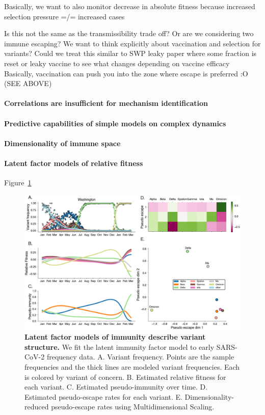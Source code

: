 \documentclass[12pt,oneside,letterpaper]{article}
\begin{document}
Basically, we want to also monitor decrease in absolute fitness because increased selection pressure =/= increased cases


Is this not the same as the transmissibility trade off? Or are we considering two immune escaping?
We want to think explicitly about vaccination and selection for variants?
Could we treat this similar to SWP leaky paper where some fraction is reset or leaky vaccine to see what changes depending on vaccine efficacy
Basically, vaccination can push you into the zone where escape is preferred :O (SEE ABOVE)

\paragraph{Correlations are insufficient for mechanism identification}%

\paragraph{Predictive capabilities of simple models on complex dynamics}%

\paragraph{Dimensionality of immune space}%

\paragraph{Latent factor models of relative fitness}

Figure~\ref{fig:latent_immune}

\begin{figure}[h]
    \centering
    \includegraphics[width=0.8\linewidth]{./figures/latent_immune.png}
    \caption{\textbf{Latent factor models of immunity describe variant structure.} 
        We fit the latent immunity factor model to early SARS-CoV-2 frequency data.
        A. Variant frequency. Points are the sample frequencies and the thick lines are modeled variant frequencies. Each is colored by variant of concern.
        B. Estimated relative fitness for each variant.
        C. Estimated pseudo-immunity over time.
        D. Estimated pseudo-escape rates for each variant.
        E. Dimensionality-reduced pseudo-escape rates using Multidimensional Scaling.
    }
\label{fig:latent_immune}
\end{figure}
\end{document}
